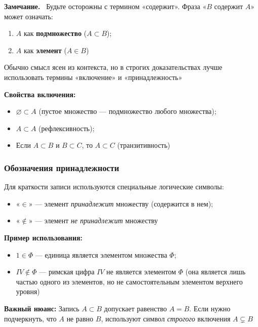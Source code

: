 \documentclass[a4paper,12pt]{article}
\newcommand{\myremark}{\textbf{Замечание.}\ }
\theoremstyle{definition}
\theoremstyle{plain}
\theoremstyle{remark}
\begin{document}
	
	
	\medskip
	
	\myremark
	Будьте осторожны с термином «содержит». Фраза «$B$ содержит $A$» может означать:
	\begin{enumerate}
		\item $A$ как \textbf{подмножество} ($A \subset B$);
		\item $A$ как \textbf{элемент} ($A \in B$)
	\end{enumerate}
	Обычно смысл ясен из контекста, но в строгих доказательствах лучше использовать термины «включение» и «принадлежность»
	
	\medskip
	
	\noindent \textbf{Свойства включения:}
	\begin{itemize}
		\item $\varnothing \subset A$ (пустое множество — подмножество любого множества);
		\item $A \subset A$ (рефлексивность);
		\item Если $A \subset B$ и $B \subset C$, то $A \subset C$ (транзитивность)
	\end{itemize}
	
	\subsubsection*{Обозначения принадлежности}
	
	Для краткости записи используются специальные логические символы:
	\begin{itemize}
		\item «$\in$» — элемент \textit{принадлежит} множеству (содержится в нем);
		\item «$\notin$» — элемент \textit{не принадлежит} множеству
	\end{itemize}
	
	\medskip
	\noindent \textbf{Пример использования:}
	\begin{itemize}
		\item $1 \in \Phi$ --- единица является элементом множества $\Phi$;
		\item $IV \notin \Phi$ --- римская цифра $IV$ не является элементом $\Phi$ (она является лишь частью одного из элементов, но не самостоятельным элементом верхнего уровня)
	\end{itemize}
	
	\bigskip
	\begin{tcolorbox}[colback=blue!5, colframe=blue!40!black]
		\textbf{Важный нюанс:} Запись $A \subset B$ допускает равенство $A = B$. Если нужно подчеркнуть, что $A$ не равно $B$, используют символ \textit{строгого} включения $A \subsetneq B$
	\end{tcolorbox}
	
\end{document}

